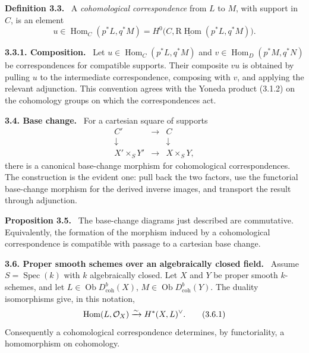 \documentclass[11pt]{article}
\theoremstyle{plain}
\theoremstyle{definition}
\theoremstyle{remark}
\newenvironment{statement}[1]{\par\medskip\noindent\textbf{#1.}\ }{\par\medskip}
\DeclareMathOperator{\Spec}{Spec}
\DeclareMathOperator{\Hom}{Hom}
\DeclareMathOperator{\ob}{Ob}
\newcommand{\R}{\mathrm R}
\begin{document}
\begin{statement}{Definition 3.3}
A \emph{cohomological correspondence} from $L$ to $M$, with support in $C$, is an element
\[
   u\in \Hom_C(p^*L,q^*M)
       =H^0\bigl(C,\underline{\R\Hom}(p^*L,q^*M)\bigr).
\]
\end{statement}

\begin{statement}{3.3.1. Composition}
Let $u\in \Hom_C(p^*L,q^*M)$ and $v\in\Hom_D(p^*M,q^*N)$ be correspondences for compatible supports. Their composite $vu$ is obtained by pulling $u$ to the intermediate correspondence, composing with $v$, and applying the relevant adjunction. This convention agrees with the Yoneda product (3.1.2) on the cohomology groups on which the correspondences act.
\end{statement}

\begin{statement}{3.4. Base change}
For a cartesian square of supports
\[
\begin{array}{ccc}
C' & \longrightarrow & C \\
\downarrow & & \downarrow \\
X'\times_S Y' & \longrightarrow & X\times_S Y,
\end{array}
\]
there is a canonical base-change morphism for cohomological correspondences. The construction is the evident one: pull back the two factors, use the functorial base-change morphism for the derived inverse images, and transport the result through adjunction.
\end{statement}

\begin{statement}{Proposition 3.5}
The base-change diagrams just described are commutative. Equivalently, the formation of the morphism induced by a cohomological correspondence is compatible with passage to a cartesian base change.
\end{statement}

\begin{statement}{3.6. Proper smooth schemes over an algebraically closed field}
Assume $S=\Spec(k)$ with $k$ algebraically closed. Let $X$ and $Y$ be proper smooth $k$-schemes, and let
$L\in\ob D^b_{\mathrm{coh}}(X)$, $M\in\ob D^b_{\mathrm{coh}}(Y)$. The duality isomorphisms give, in this notation,
\begin{equation}
   \Hom(L,\cO_X)\xrightarrow{\sim} H^*(X,L)^{\vee}.
   \tag{3.6.1}
\end{equation}
Consequently a cohomological correspondence determines, by functoriality, a homomorphism on cohomology.
\end{statement}
\end{document}
